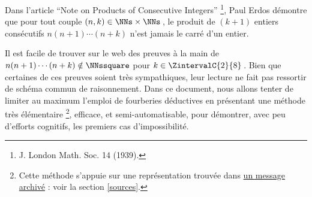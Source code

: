 Dans l'article \enquote{Note on Products of Consecutive Integers}
\footnote{
	J. London Math. Soc. 14 (1939).
},
Paul Erdos démontre que pour tout couple $(n, k) \in \NNs \times \NNs$\,, le produit de $(k+1)$ entiers consécutifs $n (n + 1) \cdots (n + k)$ n'est jamais le carré d'un entier. 

\smallskip

Il est facile de trouver sur le web des preuves à la main de $n(n+1) \cdots (n + k) \notin \NNssquare$ pour $k \in \ZintervalC{2}{8}$\,.
Bien que certaines de ces preuves soient très sympathiques, leur lecture ne fait pas ressortir de schéma commun de raisonnement.
%
Dans ce document, nous allons tenter de limiter au maximum l'emploi de fourberies déductives en présentant une méthode très élémentaire
\footnote{
	Cette méthode s'appuie sur une représentation trouvée dans \href{https://web.archive.org/web/20171110144534/http://mathforum.org/library/drmath/view/65589.html}{un message archivé} : voir la section \ref{sources}.
},
efficace, et semi-automatisable, pour démontrer, avec peu d'efforts cognitifs, les premiers cas d'impossibilité.

